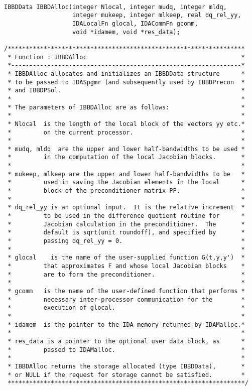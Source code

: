 \documentclass[11pt]{article}
\begin{document}
\begin{verbatim}

IBBDData IBBDAlloc(integer Nlocal, integer mudq, integer mldq, 
                   integer mukeep, integer mlkeep, real dq_rel_yy, 
                   IDALocalFn glocal, IDACommFn gcomm, 
                   void *idamem, void *res_data);

/******************************************************************
 * Function : IBBDAlloc                                           *
 *----------------------------------------------------------------*
 * IBBDAlloc allocates and initializes an IBBDData structure      *
 * to be passed to IDASpgmr (and subsequently used by IBBDPrecon  *
 * and IBBDPSol.                                                  *
 *                                                                *
 * The parameters of IBBDAlloc are as follows:                    *
 *                                                                *
 * Nlocal  is the length of the local block of the vectors yy etc.*
 *         on the current processor.                              *
 *                                                                *
 * mudq, mldq  are the upper and lower half-bandwidths to be used *
 *         in the computation of the local Jacobian blocks.       *
 *                                                                *
 * mukeep, mlkeep are the upper and lower half-bandwidths to be   *
 *         used in saving the Jacobian elements in the local      *
 *         block of the preconditioner matrix PP.                 *
 *                                                                *
 * dq_rel_yy is an optional input.  It is the relative increment  *
 *         to be used in the difference quotient routine for      *
 *         Jacobian calculation in the preconditioner.  The       *
 *         default is sqrt(unit roundoff), and specified by       *
 *         passing dq_rel_yy = 0.                                 *
 *                                                                *
 * glocal    is the name of the user-supplied function G(t,y,y')  *
 *         that approximates F and whose local Jacobian blocks    *
 *         are to form the preconditioner.                        *
 *                                                                *
 * gcomm   is the name of the user-defined function that performs *
 *         necessary inter-processor communication for the        *
 *         execution of glocal.                                   *
 *                                                                *
 * idamem  is the pointer to the IDA memory returned by IDAMalloc.*
 *                                                                *
 * res_data is a pointer to the optional user data block, as      *
 *         passed to IDAMalloc.                                   *
 *                                                                *
 * IBBDAlloc returns the storage allocated (type IBBDData),       *
 * or NULL if the request for storage cannot be satisfied.        *
 ******************************************************************/

\end{verbatim}
\end{document}
